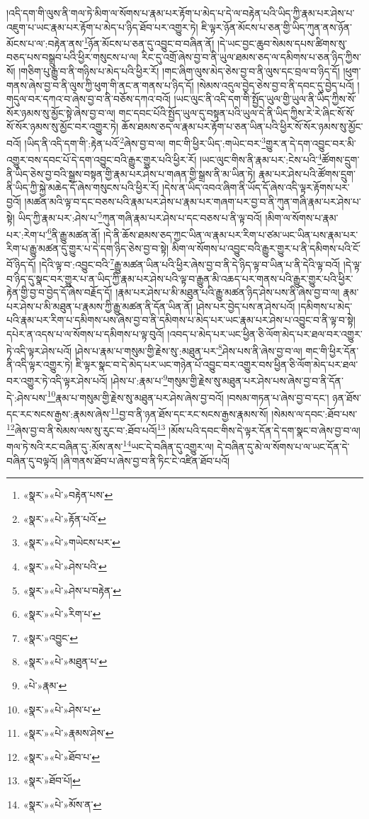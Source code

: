 །འདི་དག་གི་ལུས་ནི་གལ་ཏེ་མིག་ལ་སོགས་པ་རྣམ་པར་རྟོག་པ་མེད་པ་དེ་ལ་བརྟེན་པའི་ཡིད་ཀྱི་རྣམ་པར་ཤེས་པ་འཇུག་པ་ཡང་རྣམ་པར་རྟོག་པ་མེད་པ་ཉིད་ཐོབ་པར་འགྱུར་ཏེ། ཇི་ལྟར་ཉོན་མོངས་པ་ཅན་གྱི་ཡིད་ཀུན་ནས་ཉོན་མོངས་པ་ལ་:བརྟེན་ནས་\footnote{«སྣར་»«པེ་»བརྟེན་པས་}ཉོན་མོངས་པ་ཅན་དུ་འབྱུང་བ་བཞིན་ནོ། །དེ་ཡང་བྱང་ཆུབ་སེམས་དཔས་ཚིགས་སུ་བཅད་པས་བསྒྲུབ་པའི་ཕྱིར་གསུངས་པ་ལ། རིང་དུ་འགྲོ་ཞེས་བྱ་བ་ནི་ཡུལ་ཐམས་ཅད་ལ་དམིགས་པ་ཅན་ཉིད་ཀྱིས་སོ། །གཅིག་པུ་རྒྱུ་བ་ནི་གཉིས་པ་མེད་པའི་ཕྱིར་རོ། །གང་ཞིག་ལུས་མེད་ཅེས་བྱ་བ་ནི་ལུས་དང་བྲལ་བ་ཉིད་དོ། །ཕུག་གནས་ཞེས་བྱ་བ་ནི་ལུས་ཀྱི་ཕུག་གི་ནང་ན་གནས་པ་ཉིད་དོ། །སེམས་འདུལ་བྱེད་ཅེས་བྱ་བ་ནི་དབང་དུ་བྱེད་པའོ། །གདུལ་བར་དཀའ་བ་ཞེས་བྱ་བ་ནི་བཅོས་དཀའ་བའོ། །ཡང་ལུང་ནི་འདི་དག་གི་སྤྱོད་ཡུལ་གྱི་ཡུལ་ནི་ཡིད་ཀྱིས་སོ་སོར་ཉམས་སུ་མྱོང་སྟེ་ཞེས་བྱ་བ་ལ། གང་དབང་པོའི་སྤྱོད་ཡུལ་དུ་བསྟན་པའི་ཡུལ་དེ་ནི་ཡིད་ཀྱིས་རེ་རེ་ཞིང་སོ་སོ་སོ་སོར་ཉམས་སུ་མྱོང་བར་འགྱུར་ཏེ། ཆོས་ཐམས་ཅད་ལ་རྣམ་པར་རྟོག་པ་ཅན་ཡིན་པའི་ཕྱིར་སོ་སོར་ཉམས་སུ་མྱོང་བའོ། །ཡིད་ནི་འདི་དག་གི་:རྟེན་པའོ་\footnote{«སྣར་»«པེ་»རྟོན་པའོ་}ཞེས་བྱ་བ་ལ། གང་གི་ཕྱིར་ཡིད་:གཡེང་བར་\footnote{«སྣར་»«པེ་»གཡེངས་པར་}གྱུར་ན་དེ་དག་འབྱུང་བར་མི་འགྱུར་བས་དབང་པོ་དེ་དག་འབྱུང་བའི་རྒྱུར་གྱུར་པའི་ཕྱིར་རོ། །ཡང་ལུང་གིས་ནི་རྣམ་པར་:ངེས་པའི་\footnote{«སྣར་»«པེ་»ཤེས་པའི་}ཚོགས་དྲུག་ནི་ཡིད་ཅེས་བྱ་བའི་སྒྲས་བསྟན་གྱི་རྣམ་པར་ཤེས་པ་གཞན་གྱི་སྒྲས་ནི་མ་ཡིན་ཏེ། རྣམ་པར་ཤེས་པའི་ཚོགས་དྲུག་ནི་ཡིད་ཀྱི་སྐྱེ་མཆེད་དོ་ཞེས་གསུངས་པའི་ཕྱིར་རོ། །དེས་ན་ཡིད་འབའ་ཞིག་ནི་ཡོད་དོ་ཞེས་འདི་ལྟར་རྟོགས་པར་བྱའོ། །མཚན་མའི་ལྟ་བ་དང་བཅས་པའི་རྣམ་པར་ཤེས་པ་རྣམ་པར་གཞག་པར་བྱ་བ་ནི་ཀུན་གཞི་རྣམ་པར་ཤེས་པ་སྟེ། ཡིད་ཀྱི་རྣམ་པར་:ཤེས་པ་\footnote{«སྣར་»«པེ་»ཤེས་པ་བརྟེན་}ཀུན་གཞི་རྣམ་པར་ཤེས་པ་དང་བཅས་པ་ནི་ལྟ་བའོ། །མིག་ལ་སོགས་པ་རྣམ་པར་:རེག་པ་\footnote{«སྣར་»«པེ་»རིག་པ་}ནི་རྒྱུ་མཚན་ནོ། །དེ་ནི་ཆོས་ཐམས་ཅད་ཀྱང་ཡིན་ལ་རྣམ་པར་རིག་པ་ཙམ་ཡང་ཡིན་པས་རྣམ་པར་རིག་པ་རྒྱུ་མཚན་དུ་གྱུར་པ་དེ་དག་ཉིད་ཅེས་བྱ་བ་སྟེ། མིག་ལ་སོགས་པ་འབྱུང་བའི་རྒྱུར་གྱུར་པ་ནི་དམིགས་པའི་ངོ་བོ་ཉིད་དོ། །དེའི་ལྟ་བ་:འབྱུང་བའི་\footnote{«སྣར་»འབྱུང་}རྒྱུ་མཚན་ཡིན་པའི་ཕྱིར་ཞེས་བྱ་བ་ནི་དེ་ཉིད་ལྟ་བ་ཡིན་པ་ནི་དེའི་ལྟ་བའོ། །དེ་ལྟ་བ་ཉིད་དུ་སྣང་བར་གྱུར་པ་ན་ཡིད་ཀྱི་རྣམ་པར་ཤེས་པའི་ལྟ་བ་རྒྱུན་མི་འཆད་པར་གནས་པའི་རྒྱུར་གྱུར་པའི་ཕྱིར་རྟེན་གྱི་བྱ་བ་བྱེད་དོ་ཞེས་བརྗོད་དོ། །རྣམ་པར་ཤེས་པ་མི་མཐུན་པའི་རྒྱུ་མཚན་ཉིད་ཤེས་པས་ནི་ཞེས་བྱ་བ་ལ། རྣམ་པར་ཤེས་པ་མི་མཐུན་པ་རྣམས་ཀྱི་རྒྱུ་མཚན་ནི་དོན་ཡིན་ནོ། །ཤེས་པར་བྱེད་པས་ན་ཤེས་པའོ། །དམིགས་པ་མེད་པའི་རྣམ་པར་རིག་པ་དམིགས་པས་ཞེས་བྱ་བ་ནི་དམིགས་པ་མེད་པར་ཡང་རྣམ་པར་ཤེས་པ་འབྱུང་བ་ནི་ལྟ་བ་སྟེ། དཔེར་ན་འདས་པ་ལ་སོགས་པ་དམིགས་པ་ལྟ་བུའོ། །འབད་པ་མེད་པར་ཡང་ཕྱིན་ཅི་ལོག་མེད་པར་ཐལ་བར་འགྱུར་ཏེ་འདི་ལྟར་ཤེས་པའོ། །ཤེས་པ་རྣམ་པ་གསུམ་གྱི་རྗེས་སུ་:མཐུན་པར་\footnote{«སྣར་»«པེ་»མཐུན་པ་}ཤེས་པས་ནི་ཞེས་བྱ་བ་ལ། གང་གི་ཕྱིར་དོན་ནི་འདི་ལྟར་འགྱུར་ཏེ། ཇི་ལྟར་སྣང་བ་དེ་མེད་པར་ཡང་གཉེན་པོ་འབྱུང་བར་འགྱུར་བས་ཕྱིན་ཅི་ལོག་མེད་པར་ཐལ་བར་འགྱུར་ཏེ་འདི་ལྟར་ཤེས་པའོ། །ཤེས་པ་:རྣམ་པ་\footnote{«པེ་»རྣམ་}གསུམ་གྱི་རྗེས་སུ་མཐུན་པར་ཤེས་པས་ཞེས་བྱ་བ་ནི་དོན་དེ་:ཤེས་པས་\footnote{«སྣར་»«པེ་»ཤེས་པ་}རྣམ་པ་གསུམ་གྱི་རྗེས་སུ་མཐུན་པར་ཤེས་ཞེས་བྱ་བའོ། །བསམ་གཏན་པ་ཞེས་བྱ་བ་དང་། ཉན་ཐོས་དང་རང་སངས་རྒྱས་:རྣམས་ཞེས་\footnote{«སྣར་»«པེ་»རྣམས་ཤེས་}བྱ་བ་ནི་ཉན་ཐོས་དང་རང་སངས་རྒྱས་རྣམས་སོ། །སེམས་ལ་དབང་:ཐོབ་པས་\footnote{«སྣར་»«པེ་»ཐོབ་པ་}ཞེས་བྱ་བ་ནི་སེམས་ལས་སུ་རུང་བ་:ཐོབ་པའོ།\footnote{«སྣར་»ཐོབ་པོ།} །མོས་པའི་དབང་གིས་དེ་ལྟར་དོན་དེ་དག་སྣང་བ་ཞེས་བྱ་བ་ལ། གལ་ཏེ་སའི་རང་བཞིན་དུ་:མོས་ནས་\footnote{«སྣར་»«པེ་»མོས་ན་}ཡང་དེ་བཞིན་དུ་འགྱུར་ལ། དེ་བཞིན་དུ་མེ་ལ་སོགས་པ་ལ་ཡང་དོན་དེ་བཞིན་དུ་བལྟའོ། །ཞི་གནས་ཐོབ་པ་ཞེས་བྱ་བ་ནི་ཏིང་ངེ་འཛིན་ཐོབ་པའོ། 